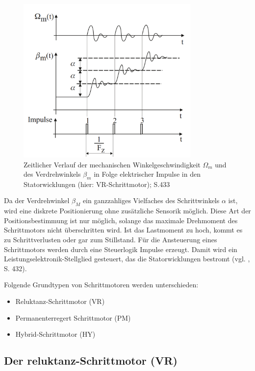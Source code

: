  
\begin{figure}[h]
	\begin{center}
		\includegraphics[width=9cm]{DiagrammVerlaufSchrittmotor.png}
		\caption{Zeitlicher Verlauf der mechanischen Winkelgeschwindigkeit $\Omega_m$ und des Verdrehwinkels $\beta_m$ in Folge elektrischer Impulse in den Statorwicklungen (hier: VR-Schrittmotor); \cite{kleinantriebe} S.433}
		\label{pic:diagrammSchrittmotor}
	\end{center}
\end{figure}



Da der Verdrehwinkel $\beta_M$ ein ganzzahliges Vielfaches des Schrittwinkels $\alpha$ ist, wird eine diskrete Positionierung ohne zusätzliche Sensorik möglich. Diese Art der Positionsbestimmung ist nur möglich, solange das maximale Drehmoment des Schrittmotors nicht überschritten wird. Ist das Lastmoment zu hoch, kommt es zu Schrittverlusten oder gar zum Stillstand.   Für die Ansteuerung eines Schrittmotors werden durch eine Steuerlogik Impulse erzeugt. Damit wird ein Leistungselektronik-Stellglied gesteuert, das die Statorwicklungen bestromt (vgl. \cite{kleinantriebe}, S. 432). \newline

Folgende Grundtypen von Schrittmotoren werden unterschieden: 
\begin{itemize}
	\item Reluktanz-Schrittmotor (VR)
	\item Permanenterregert Schrittmotor (PM)
	\item Hybrid-Schrittmotor (HY)
\end{itemize}

\newpage

\subsection{Der \acrshort{reluktanz}-Schrittmotor (VR)}

